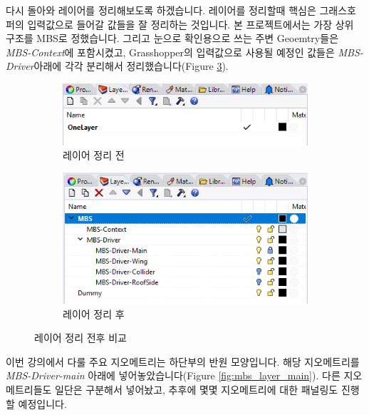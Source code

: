 \documentclass[11pt]{article}
\begin{document}
다시 돌아와 레이어를 정리해보도록 하겠습니다. 레이어를 정리할때 핵심은 그래스호퍼의 입력값으로 들어갈 값들을 잘 정리하는 것입니다. 본 프로젝트에서는 가장 상위 구조를 MBS로 정했습니다. 그리고 눈으로 확인용으로 쓰는 주변 Geoemtry들은 \textit{MBS-Context}에 포함시켰고,
Grasshopper의 입력값으로 사용될 예정인 값들은 \textit{MBS-Driver}아래에 각각 분리해서 정리했습니다(Figure \ref{fig:layer_before_after}).

\begin{figure}[H]
    \centering
    \begin{subfigure}{.45\textwidth}
        \centering
        \includegraphics[width=.9\textwidth]{./img/mbs_layer_before}
        \caption{레이어 정리 전}
        \label{fig:mbs_layer_before}
    \end{subfigure}
    \begin{subfigure}{.45\textwidth}
        \centering
        \includegraphics[width=.9\textwidth]{./img/mbs_layer_after}
        \caption{레이어 정리 후}
        \label{fig:mbs_layer_after}
    \end{subfigure}
    \caption{레이어 정리 전후 비교}
    \label{fig:layer_before_after}
\end{figure}

이번 강의에서 다룰 주요 지오메트리는 하단부의 반원 모양입니다. 해당 지오메트리를 \textit{MBS-Driver-main} 아래에 넣어놓았습니다(Figure \ref{fig:mbs_layer_main}).
 다른 지오메트리들도 일단은 구분해서 넣어놨고, 추후에 몇몇 지오메트리에 대한 패널링도 진행할 예정입니다.
\end{document}
